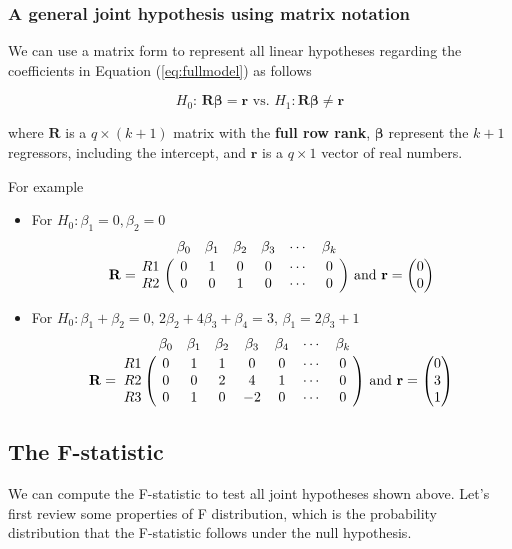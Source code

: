 \documentclass[a4paper,11pt]{article}
\begin{document}
\subsubsection*{A general joint hypothesis using matrix notation}
\label{sec:orga12e96c}

We can use a matrix form to represent all linear hypotheses regarding
the coefficients in Equation (\ref{eq:fullmodel}) as follows

\begin{equation}
\label{eq:jnt-hyp-g}
H_0:\, \mathbf{R}\boldsymbol{\beta} = \mathbf{r} \text{ vs. } H_1: \mathbf{R}\boldsymbol{\beta} \neq \mathbf{r}
\end{equation}

where \(\mathbf{R}\) is a \(q \times (k+1)\) matrix with the \textbf{full row rank},
\(\boldsymbol{\beta}\) represent the \(k+1\) regressors, including
the intercept, and \(\mathbf{r}\) is a \(q \times 1\) vector of real
numbers.

For example
\begin{itemize}
\item For \(H_0: \beta_1 = 0, \beta_2=0\)
\begin{equation*}
\mathbf{R} =
\bordermatrix{~ & \beta_0 & \beta_1 & \beta_2 & \beta_3 & \cdots & \beta_k \cr
R1 & 0 & 1 & 0 & 0 & \cdots & 0 \cr
R2 & 0 & 0 & 1 & 0 & \cdots & 0 \cr}
\text{ and }
\mathbf{r} =
\begin{pmatrix}
0 \\
0
\end{pmatrix}
\end{equation*}

\item For \(H_0: \beta_1 + \beta_2 = 0,\, 2\beta_2 + 4\beta_3 + \beta_4 =
  3,\, \beta_1 = 2 \beta_3 + 1\)
\begin{equation*}
\mathbf{R} =
\bordermatrix{~ & \beta_0 & \beta_1 & \beta_2 & \beta_3 & \beta_4 & \cdots & \beta_k \cr
R1 & 0 & 1 & 1 & 0 & 0 & \cdots & 0 \cr
R2 & 0 & 0 & 2 & 4 & 1 & \cdots & 0 \cr
R3 & 0 & 1 & 0 & -2 & 0 & \cdots & 0 \cr}
\text{ and }
\mathbf{r} =
\begin{pmatrix}
0 \\
3 \\
1
\end{pmatrix}
\end{equation*}
\end{itemize}


\subsection{The F-statistic}
\label{sec:org99dd90a}
We can compute the F-statistic to test all joint hypotheses shown
above. Let's first review some properties of F distribution, which is
the probability distribution that the F-statistic follows under the
null hypothesis.
\end{document}
